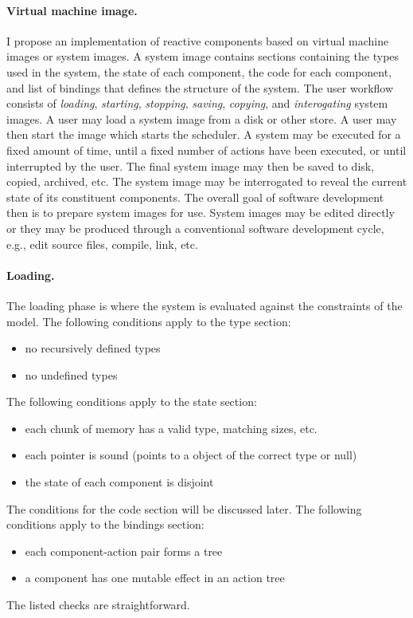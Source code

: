 \documentclass[letterpaper]{article}
\theoremstyle{definition} \newtheorem{constraint}{Constraint}
\begin{document}
\paragraph{Virtual machine image.}
I propose an implementation of reactive components based on virtual machine images or system images.
A system image contains sections containing the types used in the system, the state of each component, the code for each component, and list of bindings that defines the structure of the system.
The user workflow consists of \emph{loading}, \emph{starting}, \emph{stopping}, \emph{saving}, \emph{copying}, and \emph{interogating} system images.
A user may load a system image from a disk or other store.
A user may then start the image which starts the scheduler.
A system may be executed for a fixed amount of time, until a fixed number of actions have been executed, or until interrupted by the user.
The final system image may then be saved to disk, copied, archived, etc.
The system image may be interrogated to reveal the current state of its constituent components.
The overall goal of software development then is to prepare system images for use.
System images may be edited directly or they may be produced through a conventional software development cycle, e.g., edit source files, compile, link, etc.

\paragraph{Loading.}
The loading phase is where the system is evaluated against the constraints of the model.
The following conditions apply to the type section:
\begin{itemize}
\item no recursively defined types
\item no undefined types
\end{itemize}
The following conditions apply to the state section:
\begin{itemize}
\item each chunk of memory has a valid type, matching sizes, etc.
\item each pointer is sound (points to a object of the correct type or null)
\item the state of each component is disjoint
\end{itemize}
The conditions for the code section will be discussed later.
The following conditions apply to the bindings section:
\begin{itemize}
\item each component-action pair forms a tree
\item a component has one mutable effect in an action tree
\end{itemize}
The listed checks are straightforward.
\end{document}
